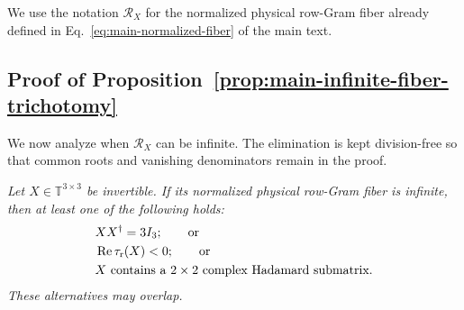\documentclass[aps,prx,reprint,nofootinbib,twoside,superscriptaddress,longbibliography,floatfix]{revtex4-2}
\theoremstyle{definition}
\newcommand{\T}{\mathbb T}
\newcommand{\RePart}{\operatorname{Re}}
\begin{document}
{We use the notation $\mathcal R_X$ for the normalized physical row-Gram fiber already defined in Eq.~\eqref{eq:main-normalized-fiber} of the main text.}

\subsection{{Proof of Proposition~\ref{prop:main-infinite-fiber-trichotomy}}}
\label{sec:local}

{We now analyze when $\mathcal R_X$ can be infinite. The elimination is kept division-free so that common roots and vanishing denominators remain in the proof.}

{\emph{Let $X\in\T^{3\times3}$ be invertible. If its normalized physical row-Gram fiber is infinite, then at least one of the following holds:}}
\begin{equation}
\begin{aligned}
&XX^{\dagger}=3I_3;\qquad\text{or}\\
&\RePart\tau_{\rm r}(X)<0;\qquad\text{or}\\
&X\text{ contains a }2\times2\text{ complex Hadamard submatrix}.
\end{aligned}
\label{eq:trichotomy}
\end{equation}
{\emph{These alternatives may overlap.}}
\end{document}
